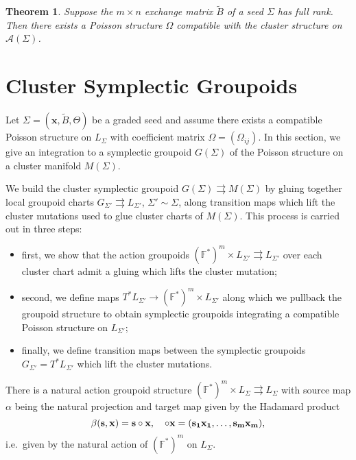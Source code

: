 \documentclass{amsart}
\newtheorem{theorem}{Theorem}[section]
\newcommand{\bfs}{\mathbf{s}}
\newcommand{\bfx}{\mathbf{x}}
\newcommand{\cA}{\mathcal{A}}
\newcommand{\FF}{\mathbb{F}}
\begin{document}
\begin{theorem}
  \cite{gekhtman-shapiro-vainshtein}
  Suppose the $m\times n$ exchange matrix $\tilde B$ of a seed $\Sigma$ has full rank.  Then there exists a Poisson structure $\Omega$ compatible with the cluster structure on $\cA(\Sigma)$.
\end{theorem}


\section{Cluster Symplectic Groupoids}
Let $\Sigma=(\bfx,\tilde B,\Theta)$ be a graded seed and assume there exists a compatible Poisson structure on $L_\Sigma$ with coefficient matrix $\Omega=(\Omega_{ij})$.  
In this section, we give an integration to a symplectic groupoid $G(\Sigma)$ of the Poisson structure on a cluster manifold $M(\Sigma)$.  

We build the cluster symplectic groupoid $G(\Sigma)\rightrightarrows M(\Sigma)$ by gluing together local groupoid charts $G_{\Sigma'}\rightrightarrows L_{\Sigma'}$, $\Sigma'\sim\Sigma$, along transition maps which lift the cluster mutations used to glue cluster charts of $M(\Sigma)$.
This process is carried out in three steps:
\begin{itemize}
  \item first, we show that the action groupoids $(\FF^*)^m\times L_{\Sigma'}\rightrightarrows L_{\Sigma'}$ over each cluster chart admit a gluing which lifts the cluster mutation;
  \item second, we define maps $T^*L_{\Sigma'}\to(\FF^*)^m\times L_{\Sigma'}$ along which we pullback the groupoid structure to obtain symplectic groupoids integrating a compatible Poisson structure on $L_{\Sigma'}$;
  \item finally, we define transition maps between the symplectic groupoids $G_{\Sigma'}=T^*L_{\Sigma'}$ which lift the cluster mutations.
\end{itemize}

There is a natural action groupoid structure $(\FF^*)^m\times L_\Sigma\rightrightarrows L_\Sigma$ with source map $\alpha$ being the natural projection and target map given by the Hadamard product
\[\beta(\bfs,\bfx)=\bfs\circ\bfx,\quad \bf\circ\bfx=(s_1x_1,\ldots,s_mx_m),\]
i.e.\ given by the natural action of $(\FF^*)^m$ on $L_\Sigma$.
\end{document}

